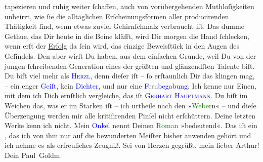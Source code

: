                tapezieren und ruhig weiter ſchaffen, auch von vorübergehenden Muthloſigkeiten
               unbeirrt, wie ſie die alltäglichen Erſcheinungsformen aller  producirenden Thätigkeit ſind, wenn etwas zuviel Gehirnſchmalz verbraucht iſt.
               Das dumme Gethue, das Dir heute in die Beine kläfft, wird Dir morgen die Hand
               ſchlecken, wenn erſt der \uline{Erfolg} da ſein wird, das
               einzige Beweisſtück in den Augen des Geſindels. Den aber wirſt Du haben, aus dem
               einfachen Grunde, weil Du von der\strikeout{\textcolor{gray}{n}} jungen ſchreibenden {\pb}Generation eines der
               größten und glänzendſten Talente biſt. Du biſt viel mehr als \textsc{\textcolor{blue}{Herzl}{}\ledrightnote{\textcolor{blue}{Theodor Herzl}}}, denn dieſer iſt – ſo erſtaunlich Dir das klingen mag, – ein enger \textcolor{blue}{Geiſt}{}, kein \textcolor{blue}{Dichter}{}, und nur eine \textcolor{blue}{F\textcolor{gray}{ern}begabung}{}. Ich kenne
               nur Einen, mit dem ich Dich ernſtlich vergleiche, das iſt \textsc{\textcolor{blue}{Gerhart Hauptmann}{}\ledrightnote{\textcolor{blue}{Gerhart Hauptmann}}}. Du biſt im Weichen das, was er im Starken iſt – ich urtheile nach den »\textcolor{green}{Weber}{}\ledrightnote{\textcolor{green}{Die Weber}}n« – und dieſe Überzeugung werden mir alle
               kritiſirenden Pinſel nicht erſchüttern. Deine letzten Werke kenn ich nicht. Mein \textcolor{blue}{Onkel}{} nennt Deinen \textcolor{green}{Roman}{} »bedeutend«. Das iſt ein
                  \label{K_L02711-6v}\label{K_L02711-6h}, das ich von ihm nur auf
               die bewunderten Meiſter bisher anwenden gehört und ich nehme es als erfreuliches
               Zeugniß.\pend
           \pstart Sei von Herzen gegrüßt, mein lieber Arthur! Dein \spacefill\mbox{Paul Goldm}\pend{}\endnumbering{}\begin{anhang}\end{anhang}
      